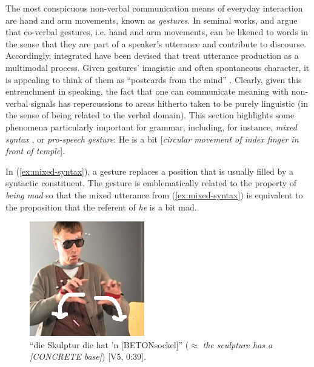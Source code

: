\documentclass[output=paper]{langsci/langscibook}
\begin{document}
The most conspicuous non-verbal communication means of everyday interaction are hand and arm movements, known as \emph{gestures}.
%
In seminal works, \citet{McNeill:1985,McNeill:1992} and \citet{Kendon:1980,Kendon:2004} argue that co-verbal gestures, i.e. hand and arm movements, can be likened to words in the sense that they are part of a speaker's utterance and contribute to discourse.
%
Accordingly, integrated  have been devised \citep{Kita:Ozyurek:2003,de:Ruiter:2000,Krauss:Chen:Gottesmann:2000} that treat utterance production as a multimodal process.
%
Given gestures' imagistic  and often spontaneous character, it is appealing to think of them as \enquote{postcards from the mind} \citep[p.~21]{de:Ruiter:2007:a}.
%
Clearly, given this entrenchment in speaking, the fact that one can communicate meaning with non-verbal signals has repercussions to areas hitherto taken to be purely linguistic (in the sense of being related to the verbal domain).
%
This section highlights some phenomena particularly important for grammar, including, for instance,  \emph{mixed syntax}  \citep{Slama-Cazacu:1976}, or \emph{pro-speech gesture}: 
%
\ea \label{ex:mixed-syntax}
He is a bit [\textit{circular movement of index finger in front of temple}].
\z

In (\ref{ex:mixed-syntax}), a gesture replaces a position that is usually filled by a syntactic constituent.
%
The gesture is emblematically related to the property of \textit{being mad} so that the mixed utterance from (\ref{ex:mixed-syntax}) is equivalent to the proposition that the referent of \textit{he} is a bit mad.

\begin{figure}
  \centering
  \includegraphics[width=5cm]{figures/Betonsockel-1}
  \caption{\enquote{die Skulptur die hat 'n [BETONsockel]} ($\approx$ \textit{the sculpture has a [CONCRETE base]}) [V5, 0:39].}
  \label{fig:betonsockel}
\end{figure}
\end{document}
